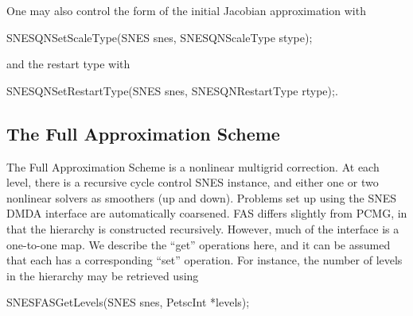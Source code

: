 One may also control the form of the initial Jacobian approximation with
\begin{tabbing}
SNESQNSetScaleType(SNES snes, SNESQNScaleType stype);
\end{tabbing}
and the restart type with
\begin{tabbing}
SNESQNSetRestartType(SNES snes, SNESQNRestartType rtype);.
\end{tabbing}

\subsection{The Full Approximation Scheme}

The Full Approximation Scheme is a nonlinear multigrid correction.  At each
level, there is a recursive cycle control SNES instance, and either one or two
nonlinear solvers as smoothers (up and down).  Problems set up using the SNES
DMDA interface are automatically coarsened.  FAS differs slightly from PCMG, in
that the hierarchy is constructed recursively.  However, much of the interface
is a one-to-one map.  We describe the ``get'' operations here, and it can be
assumed that each has a corresponding ``set'' operation.  For instance, the
number of levels in the hierarchy may be retrieved using
\begin{tabbing}
SNESFASGetLevels(SNES snes, PetscInt *levels);
\end{tabbing}

